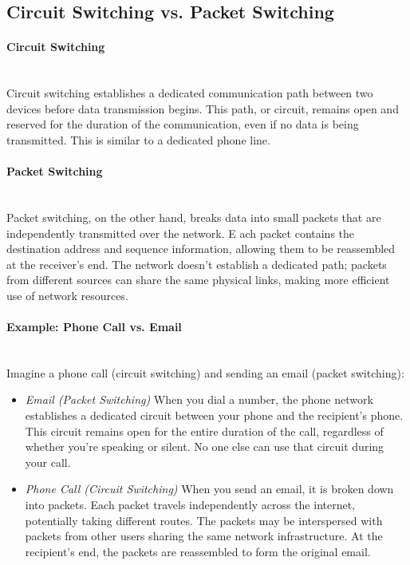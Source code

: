 \subsection{Circuit Switching vs. Packet Switching}

\paragraph{Circuit Switching} \mbox{}\\
Circuit switching establishes a dedicated communication path between two devices before data transmission begins. 
This path, or circuit, remains open and reserved for the duration of the communication, even if no data is being transmitted. 
This is similar to a dedicated phone line.

\paragraph{Packet Switching} \mbox{}\\
Packet switching, on the other hand, breaks data into small packets that are independently transmitted over the network. E
ach packet contains the destination address and sequence information, allowing them to be reassembled at the receiver's end. 
The network doesn't establish a dedicated path; packets from different sources can share the same physical links, making more efficient use of network resources. 

\paragraph{Example: Phone Call vs. Email} \mbox{}\\
Imagine a phone call (circuit switching) and sending an email (packet switching):
\begin{itemize}
    \item \textit{Email (Packet Switching)} \newline
    When you dial a number, the phone network establishes a dedicated circuit between your phone and the recipient's phone.
    This circuit remains open for the entire duration of the call, regardless of whether you're speaking or silent.
    No one else can use that circuit during your call.

    \item \textit{Phone Call (Circuit Switching)} \newline
    When you send an email, it is broken down into packets.
    Each packet travels independently across the internet, potentially taking different routes.
    The packets may be interspersed with packets from other users sharing the same network infrastructure.
    At the recipient's end, the packets are reassembled to form the original email.
\end{itemize}
